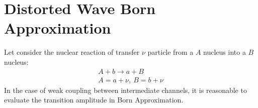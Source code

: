\documentclass[
12pt, %
oneside, %
english, %
doublespacing, %
doublespacing, %
toctotoc, %
parskip, %
headsepline, %
]{MastersDoctoralThesis} %
\begin{document}

\section{Distorted Wave Born Approximation}
Let consider the nuclear reaction of transfer $\nu$ particle from a $A$ nucleus into a $B$ nucleus:  
\begin{align}
A+b \rightarrow a + B \nonumber \\
A= a + \nu, ~ B=b+\nu
\end{align}
In the case of weak coupling between intermediate channels, it is reasonable to evaluate the transition amplitude in Born Approximation.
\end{document}
